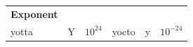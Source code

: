 {{\begin{center}
\begin{xtabular}[t]{|l|l|l|l|l|l|}
                \textbf{Exponent}
     \tabularnewline{}
    
    
        yotta &
    
    
        Y &
    
    
        
                \begin{math}{10}^{24}\end{math}
               &
    
    
        yocto &
    
    
        y &
    
    
        
                \begin{math}{10}^{-24}\end{math}
     \tabularnewline{}
    

\end{xtabular}
\end{center}}}
